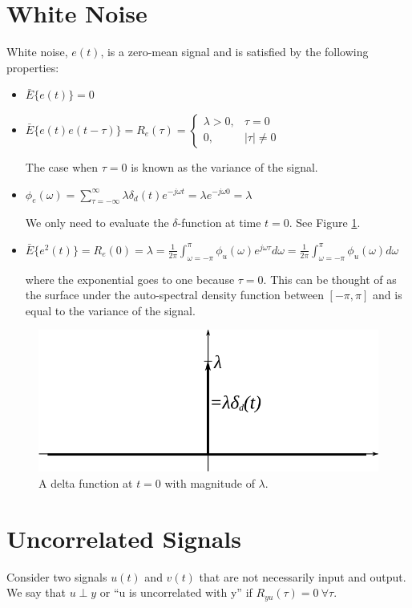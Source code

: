 \documentclass[lecture,12pt,]{pcms-l}
\theoremstyle{example}
\newcommand{\w}{\omega}
\begin{document}
\section{White Noise}
White noise, $e(t)$, is a zero-mean signal and is satisfied by the following properties:
\begin{itemize}
\item $\bar{E}\{e(t)\}=0$
\item $\bar{E}\{e(t)e(t-\tau)\} = R_e(\tau) = \begin{cases} \lambda>0, & \tau=0 \\ 0, & |\tau|\neq 0 \end{cases}$

The case when $\tau=0$ is known as the variance of the signal.
\item $\phi_e(\w) = \sum_{\tau=-\infty}^\infty \lambda\delta_d(t)e^{-j\w t} = \lambda e^{-j\w 0} = \lambda$

We only need to evaluate the $\delta$-function at time $t=0$. See Figure \ref{fig:04deltaFn}.
\item $\bar{E}\{e^2(t)\} = R_e(0) = \lambda = \frac{1}{2\pi}\int_{\w=-\pi}^\pi\phi_u(\w)e^{j\w\tau}d\w = \frac{1}{2\pi} \int_{\w=-\pi}^\pi\phi_u(\w)d\w$

where the exponential goes to one because $\tau=0$. This can be thought of as the surface under the auto-spectral density function between $[-\pi,\pi]$ and is equal to the variance of the signal.
\end{itemize}
\begin{figure}[ht!]
	\centering
	\includegraphics[width=.5\textwidth]{images/04deltaFn}
	\caption{A delta function at $t=0$ with magnitude of $\lambda$.}
	\label{fig:04deltaFn}
\end{figure}

\section{Uncorrelated Signals}
Consider two signals $u(t)$ and $v(t)$ that are not necessarily input and output. We say that $u\perp y$ or ``u is uncorrelated with y'' if $R_{yu}(\tau)=0 ~\forall \tau$.
\end{document}
